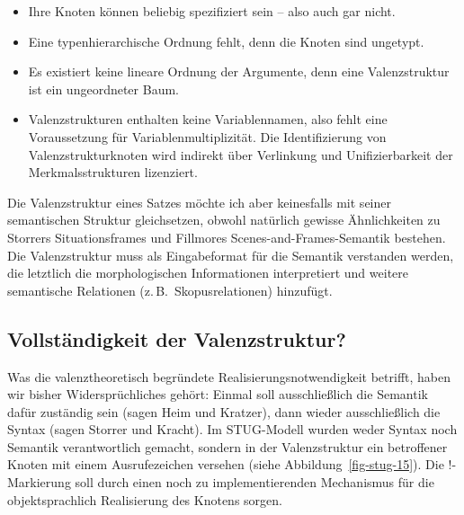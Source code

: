 {\begin{itemize}
  \item Ihre Knoten können beliebig spezifiziert sein -- also auch gar nicht. 
  \item Eine typenhierarchische Ordnung fehlt, denn die Knoten sind ungetypt.
  \item Es existiert keine lineare Ordnung der Argumente, denn eine Valenzstruktur ist ein ungeordneter Baum.
  \item Valenzstrukturen enthalten keine Variablennamen, also fehlt eine Voraussetzung für Variablenmultiplizität. Die Identifizierung von Valenzstrukturknoten wird indirekt über Verlinkung und Unifizierbarkeit der Merkmalsstrukturen lizenziert.
\end{itemize} 
Die Valenzstruktur eines Satzes möchte ich aber keinesfalls mit seiner semantischen Struktur gleichsetzen, obwohl natürlich gewisse Ähnlichkeiten zu Storrers Situationsframes und  Fillmores Scenes-and-Frames-Semantik bestehen. Die Valenzstruktur muss als Eingabeformat für die Semantik verstanden werden, die letztlich die morphologischen Informationen interpretiert und weitere semantische Relationen (z.\,B.\ Skopusrelationen) hinzufügt. 


\subsection{Vollständigkeit der Valenzstruktur?} \label{sec-stug-vollst}

Was die valenztheoretisch begründete Realisierungsnotwendigkeit betrifft, haben wir bisher Widersprüchliches gehört: Einmal soll ausschlie\ss lich die Semantik dafür zuständig sein (sagen Heim und Kratzer), dann wieder ausschlie\ss lich die Syntax (sagen Storrer und Kracht). Im STUG-Modell wurden weder Syntax noch Semantik verantwortlich gemacht, sondern  in der Valenzstruktur ein betroffener Knoten mit einem Ausrufezeichen versehen (siehe Abbildung~\ref{fig-stug-15}). Die !-Markierung soll durch einen noch zu implementierenden Mechanismus für die objektsprachlich Realisierung des Knotens sorgen. 

}

